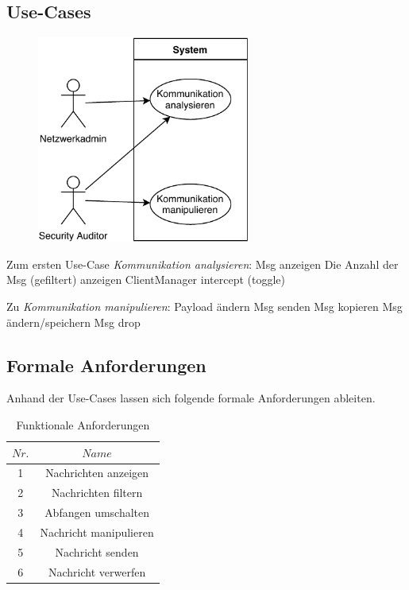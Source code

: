     \subsection{Use-Cases}
    \begin{figure}[h]%
    \centering
    \includegraphics[width=7cm]{tex/bilder/3_anforderungen/Use-Case.pdf}
    \label{fig:use-case}
\end{figure}
    Zum ersten Use-Case \emph{Kommunikation analysieren}:
    	Msg anzeigen
    	Die Anzahl der Msg (gefiltert) anzeigen
    	ClientManager intercept (toggle)
    	
    Zu \emph{Kommunikation manipulieren}:
    	Payload ändern
    	Msg senden
    	Msg kopieren
    	Msg ändern/speichern
    	Msg drop

    \subsection{Formale Anforderungen}
    Anhand der Use-Cases lassen sich folgende formale Anforderungen ableiten.
    \begin{table}[]
        \centering
        \begin{tabular}{c|c}
            \hline
            $Nr.$ & $Name$ \\ \hline
            1 & Nachrichten anzeigen \\ \hline
            2 & Nachrichten filtern \\ \hline
            3 & Abfangen umschalten \\ \hline
            4 & Nachricht manipulieren \\ \hline
            5 & Nachricht senden \\ \hline
            6 & Nachricht verwerfen \\ \hline
        \end{tabular}
        \caption{Funktionale Anforderungen}
        \label{tab:functional_requirements}
    \end{table}
    
